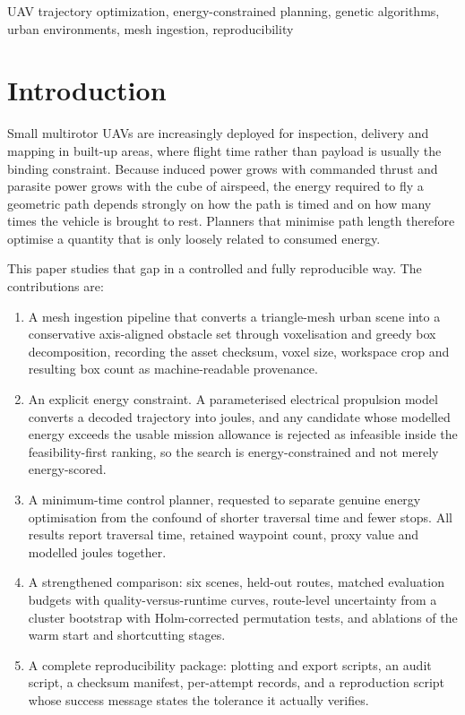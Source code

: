 \documentclass[conference]{IEEEtran}
\begin{document}
\begin{IEEEkeywords}
UAV trajectory optimization, energy-constrained planning, genetic algorithms,
urban environments, mesh ingestion, reproducibility
\end{IEEEkeywords}

\section{Introduction}
Small multirotor UAVs are increasingly deployed for inspection, delivery and
mapping in built-up areas, where flight time rather than payload is usually the
binding constraint. Because induced power grows with commanded thrust and
parasite power grows with the cube of airspeed, the energy required to fly a
geometric path depends strongly on how the path is timed and on how many times
the vehicle is brought to rest. Planners that minimise path length therefore
optimise a quantity that is only loosely related to consumed energy.

This paper studies that gap in a controlled and fully reproducible way. The
contributions are:

\begin{enumerate}
\item A mesh ingestion pipeline that converts a triangle-mesh urban scene into a
  conservative axis-aligned obstacle set through voxelisation and greedy box
  decomposition, recording the asset checksum, voxel size, workspace crop and
  resulting box count as machine-readable provenance.
\item An explicit energy constraint. A parameterised electrical propulsion model
  converts a decoded trajectory into joules, and any candidate whose modelled
  energy exceeds the usable mission allowance is rejected as infeasible inside
  the feasibility-first ranking, so the search is energy-constrained and not
  merely energy-scored.
\item A minimum-time control planner, requested to separate genuine energy
  optimisation from the confound of shorter traversal time and fewer stops. All
  results report traversal time, retained waypoint count, proxy value and
  modelled joules together.
\item A strengthened comparison: six scenes, held-out routes, matched evaluation
  budgets with quality-versus-runtime curves, route-level uncertainty from a
  cluster bootstrap with Holm-corrected permutation tests, and ablations of the
  warm start and shortcutting stages.
\item A complete reproducibility package: plotting and export scripts, an audit
  script, a checksum manifest, per-attempt records, and a reproduction script
  whose success message states the tolerance it actually verifies.
\end{enumerate}
\end{document}
